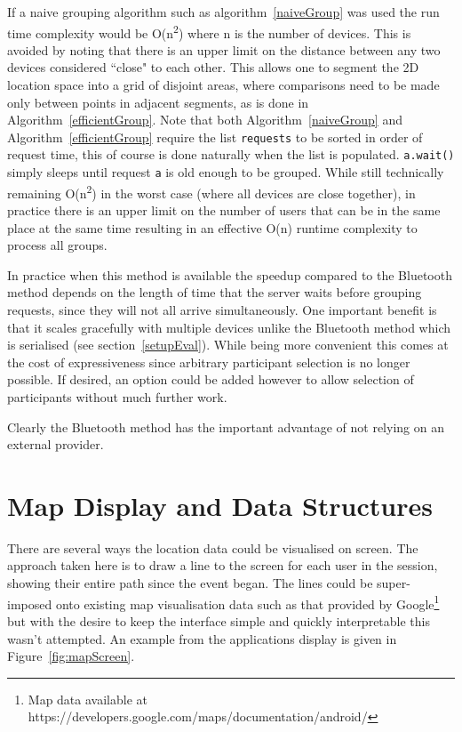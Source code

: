 If a naive grouping algorithm such as algorithm~\ref{naiveGroup} was used the run time complexity would be O(n\textsuperscript{2}) where n is the number of devices.
This is avoided by noting that there is an upper limit on the distance between any two devices considered ``close" to each other. This allows one to segment the 2D location space into a grid of disjoint areas, where comparisons need to be made only between points in adjacent segments, as is done in Algorithm~\ref{efficientGroup}. Note that both Algorithm~\ref{naiveGroup} and Algorithm~\ref{efficientGroup} require the list {\tt requests} to be sorted in order of request time, this of course is done naturally when the list is populated. {\tt a.wait()} simply sleeps until request {\tt a} is old enough to be grouped. While still technically remaining O(n\textsuperscript{2}) in the worst case (where all devices are close together), in practice there is an upper limit on the number of users that can be in the same place at the same time resulting in an effective O(n) runtime complexity to process all groups.

In practice when this method is available the speedup compared to the Bluetooth method depends on the length of time that the server waits before grouping requests, since they will not all arrive simultaneously. One important benefit is that it scales gracefully with multiple devices unlike the Bluetooth method which is serialised (see section~\ref{setupEval}).
While being more convenient this comes at the cost of expressiveness since arbitrary participant selection is no longer possible. If desired, an option could be added however to allow selection of participants without much further work.

Clearly the Bluetooth method has the important advantage of not relying on an external provider.

\section{Map Display and Data Structures}
\label{mapDrawer}

There are several ways the location data could be visualised on screen. The approach taken here is to draw a line to the screen for each user in the session, showing their entire path since the event began. The lines could be super-imposed onto existing map visualisation data such as that provided by Google\footnote{Map data available at https://developers.google.com/maps/documentation/android/} but with the desire to keep the interface simple and quickly interpretable this wasn't attempted. An example from the applications display is given in Figure~\ref{fig:mapScreen}.

